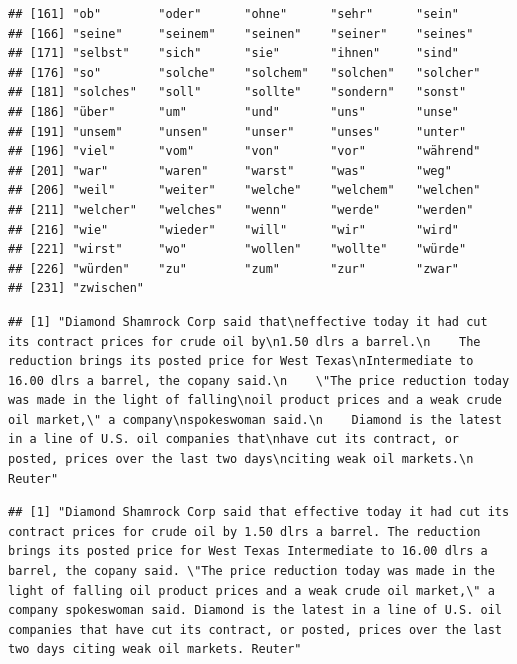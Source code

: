\documentclass[]{book}
\newenvironment{Shaded}{\begin{snugshade}}{\end{snugshade}}
\newcommand{\KeywordTok}[1]{\textcolor[rgb]{0.13,0.29,0.53}{\textbf{{#1}}}}
\newcommand{\DecValTok}[1]{\textcolor[rgb]{0.00,0.00,0.81}{{#1}}}
\newcommand{\CommentTok}[1]{\textcolor[rgb]{0.56,0.35,0.01}{\textit{{#1}}}}
\newcommand{\NormalTok}[1]{{#1}}
\begin{document}
\begin{verbatim}
## [161] "ob"        "oder"      "ohne"      "sehr"      "sein"     
## [166] "seine"     "seinem"    "seinen"    "seiner"    "seines"   
## [171] "selbst"    "sich"      "sie"       "ihnen"     "sind"     
## [176] "so"        "solche"    "solchem"   "solchen"   "solcher"  
## [181] "solches"   "soll"      "sollte"    "sondern"   "sonst"    
## [186] "über"      "um"        "und"       "uns"       "unse"     
## [191] "unsem"     "unsen"     "unser"     "unses"     "unter"    
## [196] "viel"      "vom"       "von"       "vor"       "während"  
## [201] "war"       "waren"     "warst"     "was"       "weg"      
## [206] "weil"      "weiter"    "welche"    "welchem"   "welchen"  
## [211] "welcher"   "welches"   "wenn"      "werde"     "werden"   
## [216] "wie"       "wieder"    "will"      "wir"       "wird"     
## [221] "wirst"     "wo"        "wollen"    "wollte"    "würde"    
## [226] "würden"    "zu"        "zum"       "zur"       "zwar"     
## [231] "zwischen"
\end{verbatim}

\begin{Shaded}
\end{Shaded}

\begin{verbatim}
## [1] "Diamond Shamrock Corp said that\neffective today it had cut its contract prices for crude oil by\n1.50 dlrs a barrel.\n    The reduction brings its posted price for West Texas\nIntermediate to 16.00 dlrs a barrel, the copany said.\n    \"The price reduction today was made in the light of falling\noil product prices and a weak crude oil market,\" a company\nspokeswoman said.\n    Diamond is the latest in a line of U.S. oil companies that\nhave cut its contract, or posted, prices over the last two days\nciting weak oil markets.\n Reuter"
\end{verbatim}

\begin{Shaded}
\end{Shaded}

\begin{verbatim}
## [1] "Diamond Shamrock Corp said that effective today it had cut its contract prices for crude oil by 1.50 dlrs a barrel. The reduction brings its posted price for West Texas Intermediate to 16.00 dlrs a barrel, the copany said. \"The price reduction today was made in the light of falling oil product prices and a weak crude oil market,\" a company spokeswoman said. Diamond is the latest in a line of U.S. oil companies that have cut its contract, or posted, prices over the last two days citing weak oil markets. Reuter"
\end{verbatim}
\end{document}

